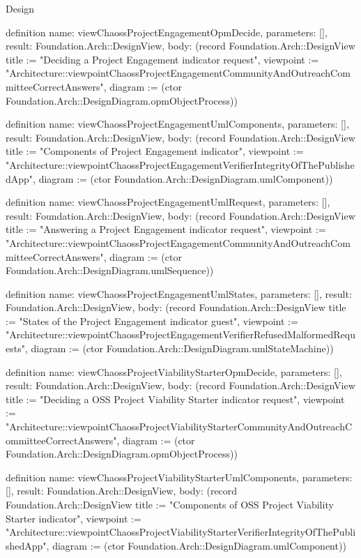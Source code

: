 \begin{lexlean}{Design}
\begin{semanticmodule}
definition{
  name: viewChaossProjectEngagementOpmDecide,
  parameters: [],
  result: Foundation.Arch::DesignView,
  body: (record Foundation.Arch::DesignView {title := "Deciding a Project Engagement indicator request", viewpoint := "Architecture::viewpointChaossProjectEngagementCommunityAndOutreachCommitteeCorrectAnswers", diagram := (ctor Foundation.Arch::DesignDiagram.opmObjectProcess)})
}

definition{
  name: viewChaossProjectEngagementUmlComponents,
  parameters: [],
  result: Foundation.Arch::DesignView,
  body: (record Foundation.Arch::DesignView {title := "Components of Project Engagement indicator", viewpoint := "Architecture::viewpointChaossProjectEngagementVerifierIntegrityOfThePublishedApp", diagram := (ctor Foundation.Arch::DesignDiagram.umlComponent)})
}

definition{
  name: viewChaossProjectEngagementUmlRequest,
  parameters: [],
  result: Foundation.Arch::DesignView,
  body: (record Foundation.Arch::DesignView {title := "Answering a Project Engagement indicator request", viewpoint := "Architecture::viewpointChaossProjectEngagementCommunityAndOutreachCommitteeCorrectAnswers", diagram := (ctor Foundation.Arch::DesignDiagram.umlSequence)})
}

definition{
  name: viewChaossProjectEngagementUmlStates,
  parameters: [],
  result: Foundation.Arch::DesignView,
  body: (record Foundation.Arch::DesignView {title := "States of the Project Engagement indicator guest", viewpoint := "Architecture::viewpointChaossProjectEngagementVerifierRefusedMalformedRequests", diagram := (ctor Foundation.Arch::DesignDiagram.umlStateMachine)})
}

definition{
  name: viewChaossProjectViabilityStarterOpmDecide,
  parameters: [],
  result: Foundation.Arch::DesignView,
  body: (record Foundation.Arch::DesignView {title := "Deciding a OSS Project Viability Starter indicator request", viewpoint := "Architecture::viewpointChaossProjectViabilityStarterCommunityAndOutreachCommitteeCorrectAnswers", diagram := (ctor Foundation.Arch::DesignDiagram.opmObjectProcess)})
}

definition{
  name: viewChaossProjectViabilityStarterUmlComponents,
  parameters: [],
  result: Foundation.Arch::DesignView,
  body: (record Foundation.Arch::DesignView {title := "Components of OSS Project Viability Starter indicator", viewpoint := "Architecture::viewpointChaossProjectViabilityStarterVerifierIntegrityOfThePublishedApp", diagram := (ctor Foundation.Arch::DesignDiagram.umlComponent)})
}


\end{semanticmodule}
\end{lexlean}
